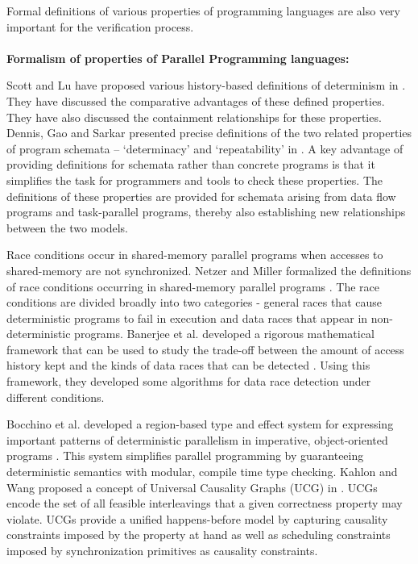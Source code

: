 Formal definitions of various properties of programming languages are also very important for the verification process.
\\
\\
\textbf{Formalism of properties of Parallel Programming languages:}

Scott and Lu have proposed various history-based definitions of determinism in \cite{lu2011toward}. They have discussed the comparative advantages of these defined properties. They have also discussed the containment relationships for these properties. Dennis, Gao and Sarkar presented precise definitions of the two related properties of program schemata – ‘determinacy’ and ‘repeatability’ in \cite{dennis2012determinacy}. A key advantage of providing definitions for schemata rather than concrete programs is that it simplifies the task for programmers and tools to check these properties. The definitions of these properties are provided for schemata arising from data flow programs and task-parallel programs, thereby also establishing new relationships between the two models.

Race conditions occur in shared-memory parallel programs when accesses to shared-memory are not synchronized. Netzer and Miller formalized the definitions of  race conditions occurring in shared-memory parallel programs \cite{netzer1992race}. The race conditions are divided broadly into two categories - general races that cause deterministic programs to fail in execution and data races that appear in non-deterministic programs. Banerjee et al. developed a rigorous mathematical framework that can be used to study the trade-off between the amount of access history kept and the kinds of data races that can be detected \cite{banerjee2006theory}. Using this framework, they developed some algorithms for data race detection under different conditions.

Bocchino et al. developed a region-based type and effect system for expressing important patterns of deterministic parallelism in imperative, object-oriented programs \cite{bocchino2009type}. This system simplifies parallel programming by guaranteeing deterministic semantics with modular, compile time type checking. Kahlon and Wang proposed a concept of Universal Causality Graphs (UCG) in \cite{kahlon2010universal}. UCGs encode the set of all feasible interleavings that a given correctness property may violate. UCGs provide a unified happens-before model by capturing causality constraints imposed by the property at hand as well as scheduling constraints imposed by synchronization primitives as causality constraints.

